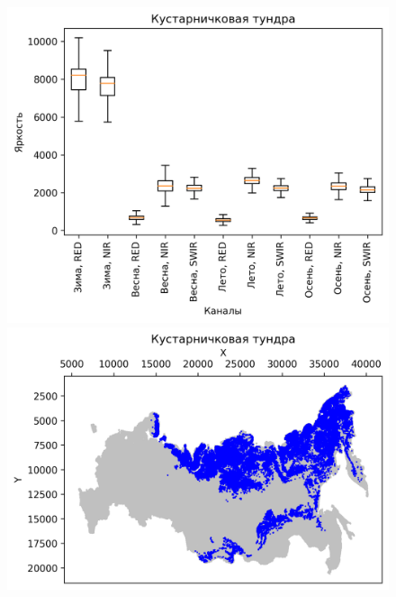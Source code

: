 \documentclass[14pt, a4paper, oneside]{extarticle}
\begin{document}
\begin{figure}[H]
    \centering
    \includegraphics[]{class-18-boxplot}
    \includegraphics[]{class-18-map}
\end{figure}
\end{document}
